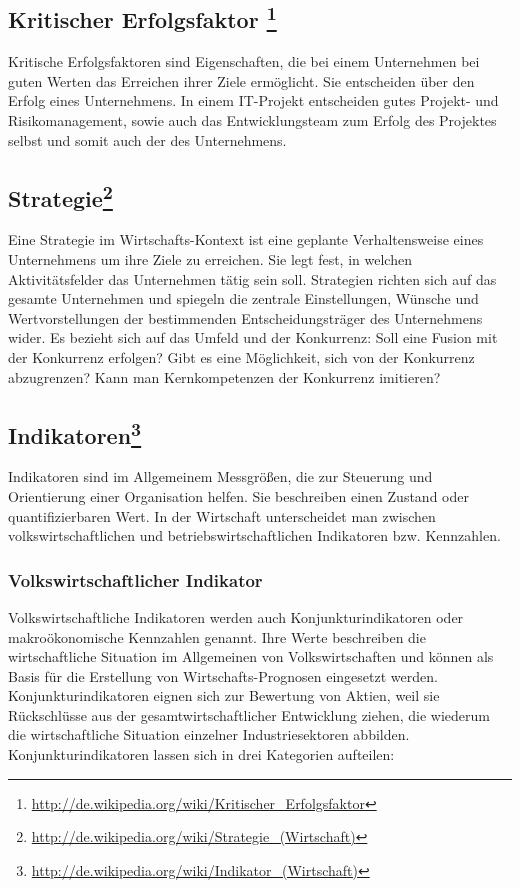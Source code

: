 \subsection[Kritischer Erfolgsfaktor]{Kritischer Erfolgsfaktor \footnote{\url{ http://de.wikipedia.org/wiki/Kritischer_Erfolgsfaktor}}}

Kritische Erfolgsfaktoren sind Eigenschaften, die bei einem Unternehmen bei guten Werten das Erreichen ihrer Ziele ermöglicht. Sie entscheiden über den Erfolg eines Unternehmens. In einem IT-Projekt entscheiden gutes Projekt- und Risikomanagement, sowie auch das Entwicklungsteam zum Erfolg des Projektes selbst und somit auch der des Unternehmens.



\subsection[Strategie]{Strategie\footnote{\url{ http://de.wikipedia.org/wiki/Strategie_(Wirtschaft)}}}
Eine Strategie im Wirtschafts-Kontext ist eine geplante Verhaltensweise eines Unternehmens um ihre Ziele zu erreichen. Sie legt fest, in welchen Aktivitätsfelder das Unternehmen tätig sein soll. Strategien richten sich auf das gesamte Unternehmen und spiegeln die zentrale Einstellungen, Wünsche und Wertvorstellungen der bestimmenden Entscheidungsträger des Unternehmens wider. Es bezieht sich auf das Umfeld und der Konkurrenz: Soll eine Fusion mit der Konkurrenz erfolgen? Gibt es eine Möglichkeit, sich von der Konkurrenz abzugrenzen? Kann man Kernkompetenzen der Konkurrenz imitieren? 



\subsection[Indikatoren]{Indikatoren\footnote{\url{ http://de.wikipedia.org/wiki/Indikator_(Wirtschaft)}}}

Indikatoren sind im Allgemeinem Messgrößen, die zur Steuerung und Orientierung einer Organisation helfen. Sie beschreiben einen Zustand oder quantifizierbaren Wert. In der Wirtschaft unterscheidet man zwischen volkswirtschaftlichen und betriebswirtschaftlichen Indikatoren bzw. Kennzahlen.

\subsubsection{Volkswirtschaftlicher Indikator}

Volkswirtschaftliche Indikatoren werden auch Konjunkturindikatoren oder makroökonomische Kennzahlen genannt. Ihre Werte beschreiben die wirtschaftliche Situation im Allgemeinen von Volkswirtschaften und können als Basis für die Erstellung von Wirtschafts-Prognosen eingesetzt werden. 
\\
Konjunkturindikatoren eignen sich zur Bewertung von Aktien, weil sie Rück\-schlüsse aus der gesamtwirtschaftlicher Entwicklung ziehen, die wiederum die wirtschaftliche Situation einzelner Industriesektoren abbilden. Konjunkturindikatoren lassen sich in drei Kategorien aufteilen:

